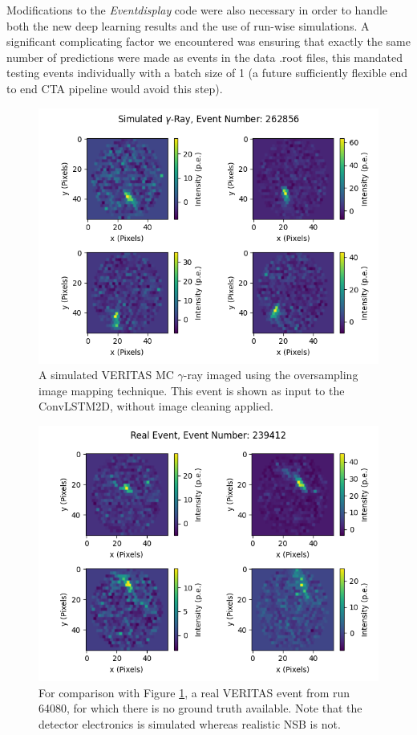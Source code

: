 Modifications to the \textit{Eventdisplay} code were also necessary in order to handle both the new deep learning results and the use of run-wise simulations. A significant complicating factor we encountered was ensuring that exactly the same number of predictions were made as events in the data .root files, this mandated testing events individually with a batch size of 1 (a future sufficiently flexible end to end CTA pipeline would avoid this step). 
\begin{figure}[] 
        \centering \includegraphics[width=0.8\columnwidth]{figures/sim_272_oversampling.png}

        \caption{
                \label{fig:sim} A simulated VERITAS MC $\gamma$-ray imaged using the oversampling image mapping technique. This event is shown as input to the ConvLSTM2D, without image cleaning applied.
        }
\end{figure}
\begin{figure}[] 
        \centering \includegraphics[width=0.8\columnwidth]{figures/realevent_303_oversampling.png}

        \caption{
                \label{fig:real} For comparison with Figure \ref{fig:sim}, a real VERITAS event from run 64080, for which there is no ground truth available. Note that the detector electronics is simulated whereas realistic NSB is not.
        }
\end{figure}

